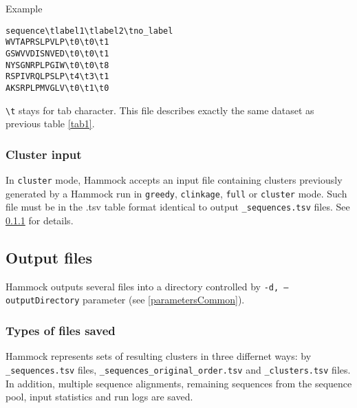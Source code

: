 \documentclass[11pt, a4paper, twoside, titlepage]{article}
\begin{document}
Example

\begin{verbatim}
sequence\tlabel1\tlabel2\tno_label
WVTAPRSLPVLP\t0\t0\t1
GSWVVDISNVED\t0\t0\t1
NYSGNRPLPGIW\t0\t0\t8
RSPIVRQLPSLP\t4\t3\t1
AKSRPLPMVGLV\t0\t1\t0
\end{verbatim}

\texttt{\textbackslash t} stays for tab character.
This file describes exactly the same dataset as previous table \ref{tab1}.

\subsubsection{Cluster input}
In \texttt{cluster} mode, Hammock accepts an input file containing clusters previously generated by a Hammock run in \texttt{greedy}, \texttt{clinkage}, \texttt{full} or \texttt{cluster} mode. Such file must be in the .tsv table format identical to output \texttt{\_sequences.tsv} files. See \ref{filesSaved} for details.


\subsection{Output files}

Hammock outputs several files into a directory controlled by \texttt{-d, --outputDirectory} parameter (see \ref{parametersCommon}).

\subsubsection{Types of files saved} \label{filesSaved}
Hammock represents sets of resulting clusters in three differnet ways: by \texttt{\_sequences.tsv} files, \texttt{\_sequences\_original\_order.tsv} and \texttt{\_clusters.tsv} files. In addition, multiple sequence alignments, remaining sequences from the sequence pool, input statistics and run logs are saved.
\end{document}
